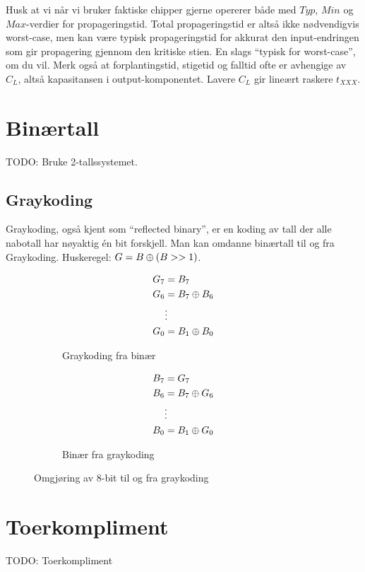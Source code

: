 \documentclass[12pt,a4paper,norsk]{article}
\begin{document}
Husk at vi når vi bruker faktiske chipper gjerne opererer
både med $Typ$, $Min$ og $Max$-verdier for propageringstid. Total
propageringstid er altså ikke nødvendigvis worst-case, men kan være typisk
propageringstid for akkurat den input-endringen som gir propagering gjennom
den kritiske stien. En slags ``typisk for worst-case'', om du vil. Merk også at
forplantingstid, stigetid og falltid ofte er avhengige av $C_{L}$, altså
kapasitansen i output-komponentet. Lavere $C_{L}$ gir lineært raskere $t_{XXX}$.

\section{Binærtall}
TODO\@: Bruke 2-tallssystemet.

\subsection{Graykoding}
Graykoding, også kjent som ``reflected binary'', er en koding av tall der alle
nabotall har nøyaktig én bit forskjell. Man kan omdanne binærtall til og fra
Graykoding. Huskeregel: $G = B \oplus (B >> 1)$.
\begin{figure}[H]
  \centering
  \begin{subfigure}{.4\textwidth}
    \centering
    \begin{align*}
      G_{7} &= B_{7} \\
      G_{6} &= B_{7} \oplus B_{6} \\
            &\vdots \\
      G_{0} &= B_{1} \oplus B_{0} \\
    \end{align*}
    \caption{Graykoding fra binær}
  \end{subfigure}
  \begin{subfigure}{.4\textwidth}
    \centering
    \begin{align*}
      B_{7} &= G_{7} \\
      B_{6} &= B_{7} \oplus G_{6} \\
            &\vdots \\
      B_{0} &= B_{1} \oplus G_{0} \\
    \end{align*}
    \caption{Binær fra graykoding}
  \end{subfigure}
  \caption{Omgjøring av 8-bit til og fra graykoding}
\end{figure}

\section{Toerkompliment}
TODO\@: Toerkompliment
\end{document}
